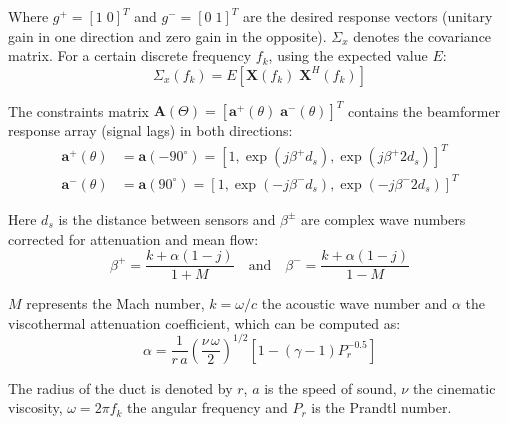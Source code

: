 Where $g^+=[1\;0]^T$ and $g^-=[0\;1]^T$ are the desired response vectors (unitary gain in one direction and zero gain in the opposite). $\Sigma_x$ denotes the covariance matrix. For a certain discrete frequency $f_k$, using the expected value $E$:
\begin{equation}
  \Sigma_x(f_k)=E[\mathbf X(f_k)\;\mathbf X^H(f_k)]
\end{equation}

The constraints matrix $\mathbf A(\Theta)=[\mathbf a^+(\theta)\; \mathbf a^-(\theta)]^T$ contains the beamformer response array (signal lags) in both directions:
\begin{align}
    \mathbf a^+(\theta) &= \mathbf a(-90^\circ)=\left[1,\exp(j\beta^+d_s),\exp(j\beta^+2d_s)\right]^T\\
    \mathbf a^-(\theta) &= \mathbf a(90^\circ)=\left[1,\exp(-j\beta^-d_s),\exp(-j\beta^-2d_s)\right]^T
\end{align}

Here $d_s$ is the distance between sensors and $\beta^\pm$ are complex wave numbers corrected for attenuation and mean flow:
\begin{equation}
    \beta^+=\frac{k+\alpha(1-j)}{1+M}\quad\text{and}\quad\beta^-=\frac{k+\alpha(1-j)}{1-M}
\end{equation}

$M$ represents the Mach number, $k=\omega/c$ the acoustic wave number and $\alpha$ the viscothermal attenuation coefficient, which can be computed as:
\begin{equation}
  \alpha=\frac{1}{r\,a}\left(\frac{\nu\,\omega}{2}\right)^{1/2}\left[1-(\gamma-1)P_r^{-0.5}\right]
\end{equation}

The radius of the duct is denoted by $r$, $a$ is the speed of sound, $\nu$ the cinematic viscosity, $\omega=2\pi f_k$ the angular frequency and $P_r$ is the Prandtl number.